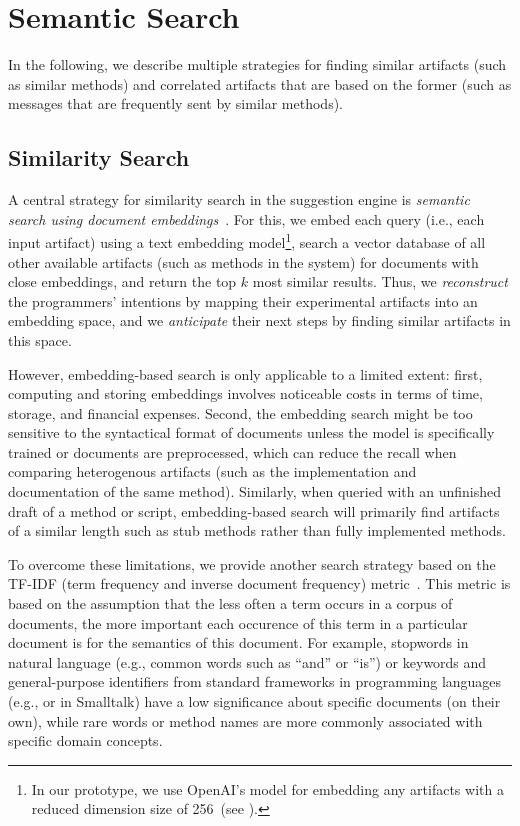 
\section{Semantic Search}
\label{sec:suggestions/search}

In the following, we describe multiple strategies for finding similar artifacts (such as similar methods) and correlated artifacts that are based on the former (such as messages that are frequently sent by similar methods).

\subsection*{Similarity Search}
\label{sec:suggestions/search/similar}

A central strategy for similarity search in the suggestion engine is \emph{semantic search using document embeddings}~\cite{lewis2020retrieval,mikolov2013efficient}.
For this, we embed each query (i.e., each input artifact) using a text embedding model\footnote{In our prototype, we use OpenAI's  model for embedding any artifacts with a reduced dimension size of 256~(see ).}, search a vector database of all other available artifacts (such as methods in the system) for documents with close embeddings, and return the top $k$ most similar results.
Thus, we \emph{reconstruct} the programmers' intentions by mapping their experimental artifacts into an embedding space, and we \emph{anticipate} their next steps by finding similar artifacts in this space.

However, embedding-based search is only applicable to a limited extent:
first, computing and storing embeddings involves noticeable costs in terms of time, storage, and financial expenses.
Second, the embedding search might be too sensitive to the syntactical format of documents unless the model is specifically trained or documents are preprocessed, which can reduce the recall when comparing heterogenous artifacts (such as the implementation and documentation of the same method).
Similarly, when queried with an unfinished draft of a method or script, embedding-based search will primarily find artifacts of a similar length such as stub methods rather than fully implemented methods.

To overcome these limitations, we provide another search strategy based on the TF-IDF (term frequency and inverse document frequency) metric~\cite{salton1988term}.
This metric is based on the assumption that the less often a term occurs in a corpus of documents, the more important each occurence of this term in a particular document is for the semantics of this document.
For example, stopwords in natural language (e.g., common words such as ``and'' or ``is'') or keywords and general-purpose identifiers from standard frameworks in programming languages (e.g.,  or  in Smalltalk) have a low significance about specific documents (on their own), while rare words or method names are more commonly associated with specific domain concepts.

